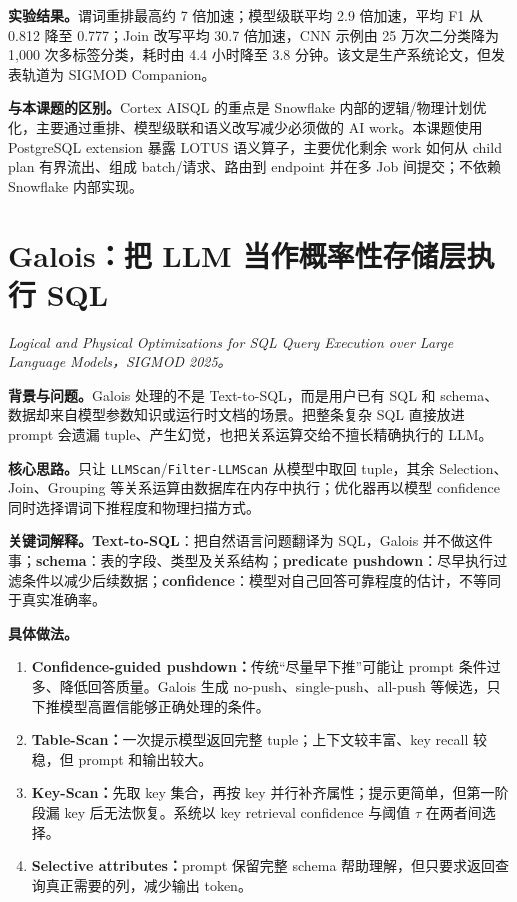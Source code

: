 \documentclass[10pt,a4paper]{ctexart}
\let\digestoriginalsection\section
\renewcommand{\section}{\Needspace{7\baselineskip}\digestoriginalsection}
\newcommand{\paperinfo}[1]{\textit{#1}\par}
\newcommand{\field}[1]{\par\noindent\textbf{#1。}\hspace{0.25em}}
\begin{document}
\field{实验结果}谓词重排最高约 7 倍加速；模型级联平均 2.9 倍加速，平均 F1 从 0.812 降至 0.777；Join 改写平均 30.7 倍加速，CNN 示例由 25 万次二分类降为 1,000 次多标签分类，耗时由 4.4 小时降至 3.8 分钟。该文是生产系统论文，但发表轨道为 SIGMOD Companion。

\field{与本课题的区别}Cortex AISQL 的重点是 Snowflake 内部的逻辑/物理计划优化，主要通过重排、模型级联和语义改写减少必须做的 AI work。本课题使用 PostgreSQL extension 暴露 LOTUS 语义算子，主要优化剩余 work 如何从 child plan 有界流出、组成 batch/请求、路由到 endpoint 并在多 Job 间提交；不依赖 Snowflake 内部实现。

\section{Galois：把 LLM 当作概率性存储层执行 SQL}
\paperinfo{Logical and Physical Optimizations for SQL Query Execution over Large Language Models，SIGMOD 2025。}

\field{背景与问题}Galois 处理的不是 Text-to-SQL，而是用户已有 SQL 和 schema、数据却来自模型参数知识或运行时文档的场景。把整条复杂 SQL 直接放进 prompt 会遗漏 tuple、产生幻觉，也把关系运算交给不擅长精确执行的 LLM。

\field{核心思路}只让 \texttt{LLMScan}/\texttt{Filter-LLMScan} 从模型中取回 tuple，其余 Selection、Join、Grouping 等关系运算由数据库在内存中执行；优化器再以模型 confidence 同时选择谓词下推程度和物理扫描方式。

\field{关键词解释}\textbf{Text-to-SQL}：把自然语言问题翻译为 SQL，Galois 并不做这件事；\textbf{schema}：表的字段、类型及关系结构；\textbf{predicate pushdown}：尽早执行过滤条件以减少后续数据；\textbf{confidence}：模型对自己回答可靠程度的估计，不等同于真实准确率。

\field{具体做法}
\begin{enumerate}
  \item \textbf{Confidence-guided pushdown：}传统“尽量早下推”可能让 prompt 条件过多、降低回答质量。Galois 生成 no-push、single-push、all-push 等候选，只下推模型高置信能够正确处理的条件。
  \item \textbf{Table-Scan：}一次提示模型返回完整 tuple；上下文较丰富、key recall 较稳，但 prompt 和输出较大。
  \item \textbf{Key-Scan：}先取 key 集合，再按 key 并行补齐属性；提示更简单，但第一阶段漏 key 后无法恢复。系统以 key retrieval confidence 与阈值 $\tau$ 在两者间选择。
  \item \textbf{Selective attributes：}prompt 保留完整 schema 帮助理解，但只要求返回查询真正需要的列，减少输出 token。
\end{enumerate}
\end{document}
